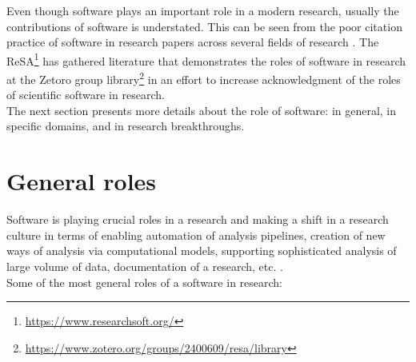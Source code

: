 Even though software plays an important role in a modern research, usually the contributions of software is understated. This can be seen from the poor citation practice of software in research papers across several fields of research \citep{schindler2021somesci,yang2018important, pan2016disciplinary}. The \ac{ReSA}\footnote{\url{https://www.researchsoft.org/}} has gathered literature that demonstrates the roles of software in research at the Zetoro group library\footnote{\url{https://www.zotero.org/groups/2400609/resa/library}} in an effort to increase acknowledgment of the roles of scientific software in research. \\

The next section presents more details about the role of software: in general, in specific domains, and in research breakthroughs.


\section{General roles}
\label{sec:Roles:Generalroles}

Software is playing crucial roles in a research and making a shift in a research culture in terms of  enabling automation of analysis pipelines, creation of new ways of analysis via computational models, supporting sophisticated analysis of large volume of data, documentation of a research, etc. \citep{jay2020software}. \\ 

\noindent Some of the most general roles of a software in research:


